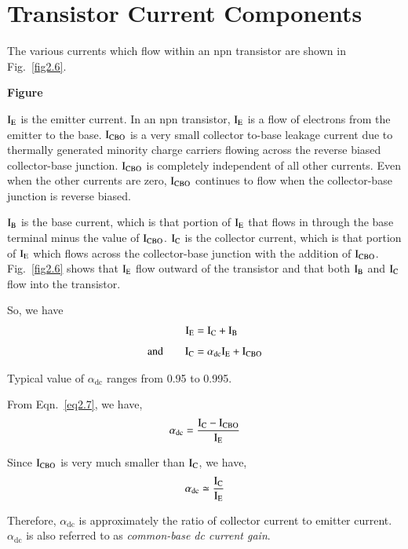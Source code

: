 \section{Transistor Current Components}\label{sec2.2}

The various currents which flow within an npn transistor are shown in Fig.~\ref{fig2.6}.
\begin{center}
{\bf Figure}
\end{center}

$\textrm{I}_{\textrm{E}}$ is the emitter current. In an npn transistor, $\textrm{I}_{\textrm{E}}$ is a flow of electrons from the emitter to the base. $\textrm{I}_{\text{CBO}}$ is a very small collector to-base leakage current due to thermally generated minority charge carriers flowing across the reverse biased collector-base junction. $\textrm{I}_{\text{CBO}}$ is completely independent of all other currents. Even when the other currents are zero, $\textrm{I}_{\text{CBO}}$ continues to flow when the collector-base junction is reverse biased.

$\textrm{I}_{\textrm{B}}$ is the base current, which is that portion of $\textrm{I}_{\textrm{E}}$ that flows in through the base terminal minus the value of $\textrm{I}_{\text{CBO}}$. $\textrm{I}_{\textrm{C}}$ is the collector current, which is that portion of $\textrm{I}_{\textrm{E}}$ which flows across the collector-base junction with the addition of $\textrm{I}_{\text{CBO}}$. Fig.~\ref{fig2.6} shows that $\textrm{I}_{\textrm{E}}$ flow outward of the transistor and that both $\textrm{I}_{\textrm{B}}$ and $\textrm{I}_{\textrm{C}}$ flow into the transistor.

So, we have
\begin{align}
\textrm{I}_{\textrm{E}} &= \textrm{I}_{\textrm{C}}+\textrm{I}_{\textrm{B}}\label{eq2.6}\\[4pt]
\text{and}\qquad \textrm{I}_{\textrm{C}} &= \alpha_{\text{dc}}\textrm{I}_{\textrm{E}}+\textrm{I}_{\text{CBO}}\label{eq2.7}
\end{align}

Typical value of $\alpha_{\text{dc}}$ ranges from 0.95 to 0.995.

From Eqn.~\eqref{eq2.7}, we have,
\begin{equation}
\alpha_{\text{dc}} = \frac{\textrm{I}_{\textrm{C}}-\textrm{I}_{\text{CBO}}}{\textrm{I}_{\textrm{E}}}\label{eq2.8}
\end{equation}

Since $\textrm{I}_{\text{CBO}}$ is very much smaller than $\textrm{I}_{\textrm{C}}$, we have,
\begin{equation}
\alpha_{\text{dc}}\simeq \frac{\textrm{I}_{\textrm{C}}}{\textrm{I}_{\textrm{E}}}\label{eq2.9}
\end{equation}

Therefore, $\alpha_{\text{dc}}$ is approximately the ratio of collector current to emitter current. $\alpha_{\text{dc}}$ is also referred to as {\em common-base dc current gain}.

